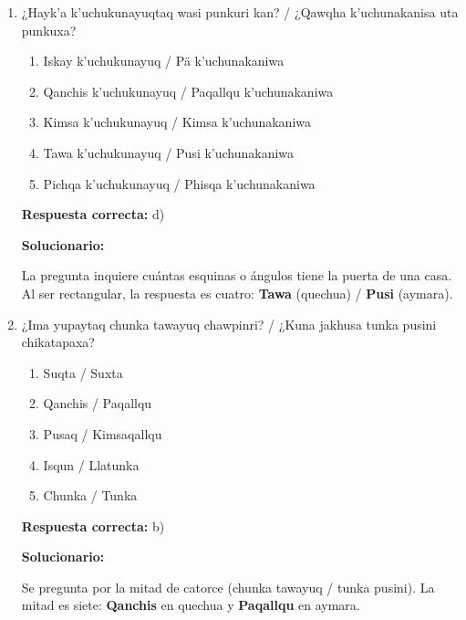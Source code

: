 \begin{enumerate}[resume]



\item ¿Hayk'a k'uchukunayuqtaq wasi punkuri kan? / ¿Qawqha k'uchunakanisa uta punkuxa?

\begin{enumerate}[label=\alph*)]
	\item Iskay k'uchukunayuq / Pä k'uchunakaniwa
	\item Qanchis k'uchukunayuq / Paqallqu k'uchunakaniwa
	\item Kimsa k'uchukunayuq / Kimsa k'uchunakaniwa
	\item Tawa k'uchukunayuq / Pusi k'uchunakaniwa
	\item Pichqa k'uchukunayuq / Phisqa k'uchunakaniwa
\end{enumerate}

\textbf{Respuesta correcta:} d)

\vspace{2mm}
\textbf{Solucionario:}

La pregunta inquiere cuántas esquinas o ángulos tiene la puerta de una casa. Al ser rectangular, la respuesta es cuatro: \textbf{Tawa} (quechua) / \textbf{Pusi} (aymara).

\vspace{6mm}

\item ¿Ima yupaytaq chunka tawayuq chawpinri? / ¿Kuna jakhusa tunka pusini chikatapaxa?

\begin{enumerate}[label=\alph*)]
	\item Suqta / Suxta
	\item Qanchis / Paqallqu
	\item Pusaq / Kimsaqallqu
	\item Isqun / Llatunka
	\item Chunka / Tunka
\end{enumerate}

\textbf{Respuesta correcta:} b)

\vspace{2mm}
\textbf{Solucionario:}

Se pregunta por la mitad de catorce (chunka tawayuq / tunka pusini). La mitad es siete: \textbf{Qanchis} en quechua y \textbf{Paqallqu} en aymara.



\end{enumerate}










